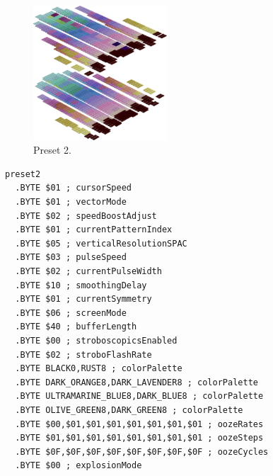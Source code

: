\vspace*{-0.5cm}
\begin{minipage}[b]{0.48\linewidth}
\begin{figure}[H]                                                          
  \centering                                                             
  \begin{adjustbox}{width=5cm,center}                                   
  \includegraphics[width=5cm]{src/colorspace_presets/preset2-45.png}%
  \end{adjustbox}                                                        
\caption*{Preset 2.}                                           
\end{figure}                                                               
\end{minipage}
\hspace{0.1cm}
\begin{minipage}[b]{0.48\linewidth}                                                                         
\begin{lstlisting}[basicstyle=\ttfamily\tiny]
preset2
  .BYTE $01 ; cursorSpeed
  .BYTE $01 ; vectorMode
  .BYTE $02 ; speedBoostAdjust
  .BYTE $01 ; currentPatternIndex
  .BYTE $05 ; verticalResolutionSPAC
  .BYTE $03 ; pulseSpeed
  .BYTE $02 ; currentPulseWidth
  .BYTE $10 ; smoothingDelay
  .BYTE $01 ; currentSymmetry
  .BYTE $06 ; screenMode
  .BYTE $40 ; bufferLength
  .BYTE $00 ; stroboscopicsEnabled
  .BYTE $02 ; stroboFlashRate
  .BYTE BLACK0,RUST8 ; colorPalette
  .BYTE DARK_ORANGE8,DARK_LAVENDER8 ; colorPalette
  .BYTE ULTRAMARINE_BLUE8,DARK_BLUE8 ; colorPalette
  .BYTE OLIVE_GREEN8,DARK_GREEN8 ; colorPalette
  .BYTE $00,$01,$01,$01,$01,$01,$01,$01 ; oozeRates
  .BYTE $01,$01,$01,$01,$01,$01,$01,$01 ; oozeSteps
  .BYTE $0F,$0F,$0F,$0F,$0F,$0F,$0F,$0F ; oozeCycles
  .BYTE $00 ; explosionMode
\end{lstlisting}
\end{minipage}


